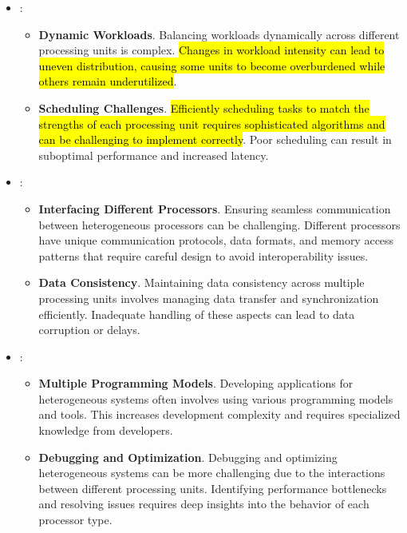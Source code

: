 \begin{itemize}
    \item {}:
    \begin{itemize}
        \item \textbf{Dynamic Workloads}. Balancing workloads dynamically across different processing units is complex. \hl{Changes in workload intensity can lead to uneven distribution, causing some units to become overburdened while others remain underutilized}.

        \item \textbf{Scheduling Challenges}. \hl{Efficiently scheduling tasks to match the strengths of each processing unit requires sophisticated algorithms and can be challenging to implement correctly}. Poor scheduling can result in suboptimal performance and increased latency.
    \end{itemize}

    \item {}:
    \begin{itemize}
        \item \textbf{Interfacing Different Processors}. Ensuring seamless communication between heterogeneous processors can be challenging. Different processors have unique communication protocols, data formats, and memory access patterns that require careful design to avoid interoperability issues.

        \item \textbf{Data Consistency}. Maintaining data consistency across multiple processing units involves managing data transfer and synchronization efficiently. Inadequate handling of these aspects can lead to data corruption or delays.
    \end{itemize}

    \item {}:
    \begin{itemize}
        \item \textbf{Multiple Programming Models}. Developing applications for heterogeneous systems often involves using various programming models and tools. This increases development complexity and requires specialized knowledge from developers.

        \item \textbf{Debugging and Optimization}. Debugging and optimizing heterogeneous systems can be more challenging due to the interactions between different processing units. Identifying performance bottlenecks and resolving issues requires deep insights into the behavior of each processor type.
    \end{itemize}
\end{itemize}